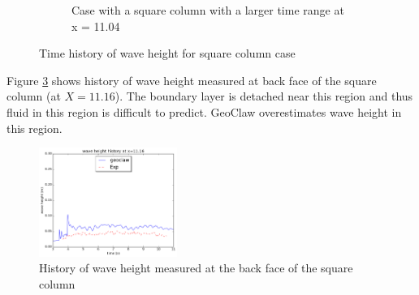 \documentclass[11pt]{article}
\begin{document}
\begin{figure}[h!]
\begin{subfigure}[b]{0.4\textwidth}
        \caption{Case with a square column with a larger time range at x = 11.04}
        \label{fig:waveheight_square_x=11.04}
    \end{subfigure}
    \caption{Time history of wave height for square column case}
\end{figure}
\par
Figure \ref{fig:waveheight_square_back} shows history of wave height measured at back face of the square column (at $X = 11.16$). The boundary layer is detached near this region and thus fluid in this region is difficult to predict. GeoClaw overestimates wave height in this region.  
\begin{figure}[h!]
    \centering
    \includegraphics[width=0.4\textwidth]{./plots/waveheight_square_back}
    \caption{History of wave height measured at the back face of the square column}
    \label{fig:waveheight_square_back}
\end{figure}

\end{document}
